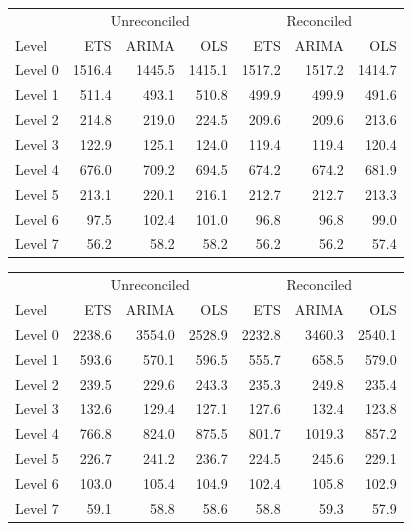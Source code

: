 \documentclass[11pt,a4paper,]{article}
\let\origtable\table
\let\endorigtable\endtable
\renewenvironment{table}[1][2] {
    \expandafter\origtable\expandafter[!htbp]
} {
    \endorigtable
}
\begin{document}
\begin{table}[!h]

\caption{\label{tab:Tourismdataresulrolling}Mean(RMSE) for ETS, ARIMA and OLS with and without reconciliation - Rolling origin 24-step-ahead - Tourism dataset}
\centering
\begin{tabular}{lrrrrrr}
\toprule
\multicolumn{1}{c}{} & \multicolumn{3}{c}{Unreconciled} & \multicolumn{3}{c}{Reconciled} \\
\cmidrule(l{2pt}r{2pt}){2-4} \cmidrule(l{2pt}r{2pt}){5-7}
Level & ETS & ARIMA & OLS & ETS & ARIMA & OLS\\
\midrule
Level 0 & 1516.4 & 1445.5 & 1415.1 & 1517.2 & 1517.2 & 1414.7\\
Level 1 & 511.4 & 493.1 & 510.8 & 499.9 & 499.9 & 491.6\\
Level 2 & 214.8 & 219.0 & 224.5 & 209.6 & 209.6 & 213.6\\
Level 3 & 122.9 & 125.1 & 124.0 & 119.4 & 119.4 & 120.4\\
Level 4 & 676.0 & 709.2 & 694.5 & 674.2 & 674.2 & 681.9\\
Level 5 & 213.1 & 220.1 & 216.1 & 212.7 & 212.7 & 213.3\\
Level 6 & 97.5 & 102.4 & 101.0 & 96.8 & 96.8 & 99.0\\
Level 7 & 56.2 & 58.2 & 58.2 & 56.2 & 56.2 & 57.4\\
\bottomrule
\end{tabular}
\end{table}

\begin{table}[t]

\caption{\label{tab:TourismdataresultRMSE}Mean(RMSE) for ETS, ARIMA and OLS with and without reconciliation - Fixed origin 24-step-ahead - Tourism dataset}
\centering
\begin{tabular}{lrrrrrr}
\toprule
\multicolumn{1}{c}{} & \multicolumn{3}{c}{Unreconciled} & \multicolumn{3}{c}{Reconciled} \\
\cmidrule(l{2pt}r{2pt}){2-4} \cmidrule(l{2pt}r{2pt}){5-7}
Level & ETS & ARIMA & OLS & ETS & ARIMA & OLS\\
\midrule
Level 0 & 2238.6 & 3554.0 & 2528.9 & 2232.8 & 3460.3 & 2540.1\\
Level 1 & 593.6 & 570.1 & 596.5 & 555.7 & 658.5 & 579.0\\
Level 2 & 239.5 & 229.6 & 243.3 & 235.3 & 249.8 & 235.4\\
Level 3 & 132.6 & 129.4 & 127.1 & 127.6 & 132.4 & 123.8\\
Level 4 & 766.8 & 824.0 & 875.5 & 801.7 & 1019.3 & 857.2\\
Level 5 & 226.7 & 241.2 & 236.7 & 224.5 & 245.6 & 229.1\\
Level 6 & 103.0 & 105.4 & 104.9 & 102.4 & 105.8 & 102.9\\
Level 7 & 59.1 & 58.8 & 58.6 & 58.8 & 59.3 & 57.9\\
\bottomrule
\end{tabular}
\end{table}
\end{document}
